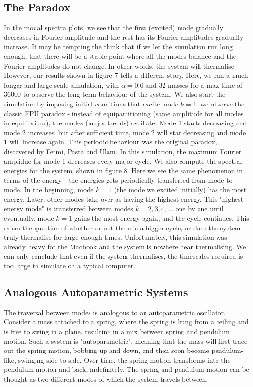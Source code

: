 \documentclass{article}
\begin{document}
\subsection{The Paradox}
In the modal spectra plots, we see that the first (excited) mode gradually decreases
in Fourier amplitude and the rest has its Fourier amplitudes gradually increase.
It may be tempting the think that if we let the simulation run long enough,
 that there will 
be a stable point where all the modes balance and the Fourier amplitudes do not change. In other words, 
the system will thermalise. However, our results shown in figure 7 tells a different story. Here, 
we run a much longer and large scale simulation, with $\alpha=0.6$ and 32 masses for a max time of 
36000 to observe the long term behaviour of the system. 
We also start the simulation by imposing initial conditions that excite mode $k=1$. 
 we observe the classic FPU paradox - 
instead of equipartitioning (same amplitude for all modes in equilibrium), 
the modes (major trends) oscillate. Mode 1 starts decreasing and 
mode 2 increases, but after sufficient time, mode 2 will star
 decreasing and mode 1 will increase again. 
This periodic behaviour was the original paradox, discovered by Fermi, Pasta and Ulam. 
In this simulation, the maximum Fourier amplidue for mode 1 decreases every major cycle.
We also compute the 
spectral energies for the system, shown in figure 8. Here we see the same phenomenon 
in terms of the energy - the energies gets 
periodically transferred from mode to mode. In the beginning,
 mode $k=1$ (the mode we excited initially) has the most energy. Later, 
other modes take over as having the highest energy. This "highest energy mode" is transferred 
between modes $k=2,3,4,...$ one by one until eventually, mode $k=1$ 
gains the most energy again, and the cycle continues. 
This raises the question of whether or not there is a bigger cycle, or does 
the system truly thermalise for large enough times. 
Unfortunately, this simulation was already heavy for the Macbook and the system is 
nowhere near thermalising. We can only conclude that even if the system thermalises,
the timescales required is too large to simulate on a typical computer. 
\subsection{Analogous Autoparametric Systems}
The traversal between modes is analogous to an autoparametric oscillator. 
Consider a mass attached to a spring, where the spring is hung from a ceiling and 
is free to swing in a plane, resulting in a mix between spring and pendulum motion. 
Such a system is "autoparametric", meaning that the mass will first trace out 
the spring motion, bobbing up and down, and then soon become pendulum-like,
 swinging side to side. Over time, the 
spring motion transforms into the pendulum motion and back, 
indefinitely.
The spring and pendulum motion can be 
thought as two different modes of which the system travels between.
\end{document}
